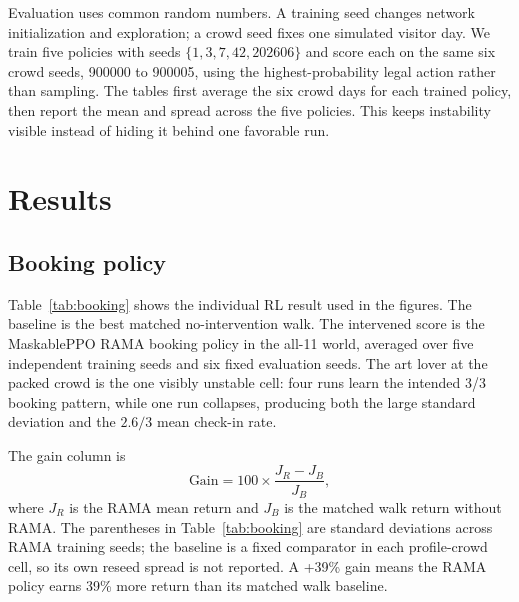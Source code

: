 \documentclass[11pt]{article}
\newcommand{\added}[1]{{\color{green!50!black}#1}}
\newenvironment{addedblock}{\begingroup\color{green!50!black}}{\endgroup}
\begin{document}
\begin{addedblock}
Evaluation uses common random numbers. A training seed changes network initialization and exploration;
a crowd seed fixes one simulated visitor day. We train five policies with seeds
$\{1,3,7,42,202606\}$ and score each on the same six crowd seeds, 900000 to 900005, using the
highest-probability legal action rather than sampling. The tables first average the six crowd days for
each trained policy, then report the mean and spread across the five policies. This keeps instability
visible instead of hiding it behind one favorable run.
\end{addedblock}

\section{Results}

\subsection{Booking policy}

Table~\ref{tab:booking} shows the individual RL result used in the figures. The baseline is the best
matched no-intervention walk. The intervened score is the MaskablePPO RAMA booking policy in the
all-11 world, averaged over five independent training seeds and six fixed evaluation seeds. The art
lover at the packed crowd is the one visibly unstable cell: four runs learn the intended 3/3 booking
pattern, while one run collapses, producing both the large standard deviation and the $2.6/3$ mean
check-in rate.

\begin{addedblock}
The gain column is
\[
\text{Gain}=100\times
\frac{J_{\!R}-J_{\!B}}{J_{\!B}},
\]
where $J_{\!R}$ is the RAMA mean return and $J_{\!B}$ is the matched walk return without RAMA. The
parentheses in Table~\ref{tab:booking} are standard deviations across RAMA training seeds; the
baseline is a fixed comparator in each profile-crowd cell, so its own reseed spread is not reported.
\added{A +39\% gain means the RAMA policy earns 39\% more return than its matched walk baseline.}
\end{addedblock}
\end{document}
